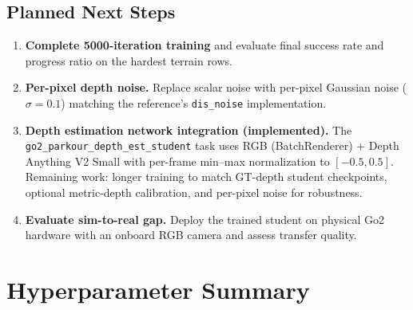\documentclass[11pt,a4paper]{article}
\begin{document}
\subsection{Planned Next Steps}

\begin{enumerate}
  \item \textbf{Complete 5000-iteration training} and evaluate final success rate
        and progress ratio on the hardest terrain rows.

  \item \textbf{Per-pixel depth noise.} Replace scalar noise with per-pixel
        Gaussian noise ($\sigma = 0.1$) matching the reference's
        \texttt{dis\_noise} implementation.

  \item \textbf{Depth estimation network integration (implemented).}
        The \texttt{go2\_parkour\_depth\_est\_student} task uses RGB
        (BatchRenderer) + Depth Anything V2 Small with per-frame min--max
        normalization to $[-0.5,0.5]$. Remaining work: longer training to match
        GT-depth student checkpoints, optional metric-depth calibration, and
        per-pixel noise for robustness.

  \item \textbf{Evaluate sim-to-real gap.} Deploy the trained student on
        physical Go2 hardware with an onboard RGB camera and assess transfer
        quality.
\end{enumerate}

\section{Hyperparameter Summary}
\end{document}
